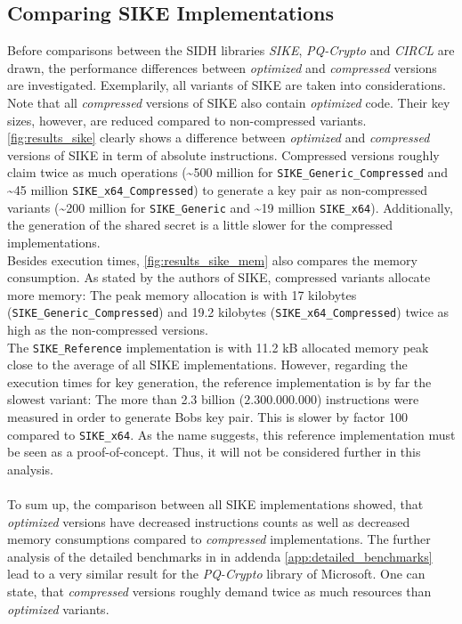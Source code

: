\subsection{Comparing SIKE Implementations}\label{sec:analysis_sike}
Before comparisons between the SIDH libraries \textit{SIKE}, \textit{PQ-Crypto} and \textit{CIRCL} are drawn, the performance differences between \textit{optimized} and \textit{compressed} versions are investigated. Exemplarily, all variants of SIKE are taken into considerations. Note that all \textit{compressed} versions of SIKE also contain \textit{optimized} code. Their key sizes, however, are reduced compared to non-compressed variants.
\\
\autoref{fig:results_sike} clearly shows a difference between \textit{optimized} and \textit{compressed} versions of SIKE in term of absolute instructions. Compressed versions roughly claim twice as much operations (\textasciitilde 500 million for \texttt{SIKE\_Generic\_Compressed} and \textasciitilde 45 million \texttt{SIKE\_x64\_Compressed}) to generate a key pair as non-compressed variants (\textasciitilde 200 million for \texttt{SIKE\_Generic} and \textasciitilde 19 million \texttt{SIKE\_x64}). Additionally, the generation of the shared secret is a little slower for the compressed implementations.\\
Besides execution times, \autoref{fig:results_sike_mem} also compares the memory consumption. As stated by the authors of SIKE, compressed variants allocate more memory: The peak memory allocation is with 17 kilobytes (\texttt{SIKE\_Generic\_Compressed}) and 19.2 kilobytes (\texttt{SIKE\_x64\_Compressed}) twice as high as the non-compressed versions.\\
The \texttt{SIKE\_Reference} implementation is with 11.2 kB allocated memory peak close to the average of all SIKE implementations. However, regarding the execution times for key generation, the reference implementation is by far the slowest variant: The more than 2.3 billion ($2.300.000.000$) instructions were measured in order to generate Bobs key pair. This is slower by factor 100 compared to \texttt{SIKE\_x64}. As the name suggests, this reference implementation must be seen as a proof-of-concept. Thus, it will not be considered further in this analysis.
\\\\
To sum up, the comparison between all SIKE implementations showed, that \textit{optimized} versions have decreased instructions counts as well as decreased memory consumptions compared to \textit{compressed} implementations. The further analysis of the detailed benchmarks in in addenda \ref{app:detailed_benchmarks} lead to a very similar result for the \textit{PQ-Crypto} library of Microsoft.
One can state, that \textit{compressed} versions roughly demand twice as much resources than \textit{optimized} variants.

